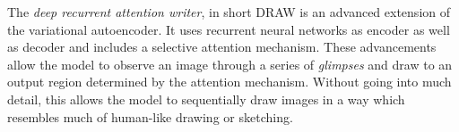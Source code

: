 The \emph{deep recurrent attention writer}\cite{draw:2015}, in short DRAW is an advanced extension of the variational autoencoder.
It uses recurrent neural networks as encoder as well as decoder and includes a selective attention mechanism.
These advancements allow the model to observe an image through a series of \emph{glimpses} and draw to an output region determined by the attention mechanism.
Without going into much detail, this allows the model to sequentially draw images in a way which resembles much of human-like drawing or sketching.




